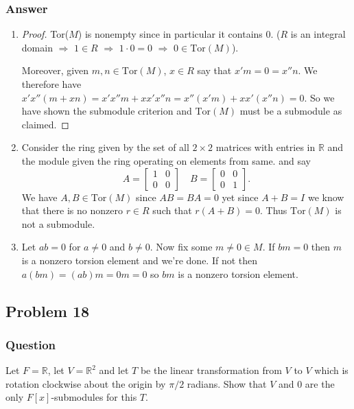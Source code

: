\documentclass[12pt]{article}
\begin{document}
\subsubsection{Answer}
\begin{enumerate}
\item \begin{proof} Tor($M$) is nonempty since in particular it contains $0$. ($R$ is an integral domain $\Rightarrow$ $1 \in R$ $\Rightarrow$ $ 1 \cdot 0 = 0$ $\Rightarrow$ $0 \in \mathrm{Tor}(M) $).

 Moreover, given $m, n \in  \mathrm{Tor}(M) $, $x \in R $ say that $x' m =0= x'' n$.  We therefore have $x'x''(m + x n)=x'x''m+x x'x'' n= x''(x'm)+ x x' (x'' n) =0$. So we have shown the submodule criterion and  $\mathrm{Tor}(M) $ must be a submodule as claimed.
\end{proof}
\item Consider the ring given by the set of all $2 \times 2$ matrices with entries in $\mathbb{R}$ and the module given the ring operating on elements from same. and say
\[A = \left[\begin{array}{lr} 1 & 0 \\0&0 \end{array} \right]  \quad B = \left[\begin{array}{lr} 0 & 0 \\0&1 \end{array} \right] .  \]
We have $A, B \in \mathrm{Tor}(M) $ since $AB=BA=0$ yet since $A+B=I$ we know that there is no nonzero $r \in R $ such that $r(A+B)=0$. Thus $\mathrm{Tor}(M) $ is not a submodule.
\item Let $a b = 0$ for $a\neq0$  and $b \neq 0$. Now fix some $m\neq 0  \in M$. If $b m = 0$ then $m$ is a nonzero torsion element and we're done. If not then $a ( b m ) =(a b) m  = 0 m = 0$ so $b m $ is a nonzero torsion element.
\end{enumerate}

\subsection{Problem 18}

\subsubsection{Question}
Let $F = \mathbb{R}$, let $V = \mathbb{R}^2$ and let $T$ be the linear transformation from $V$ to $V$ which is rotation clockwise about the origin by $\pi / 2$ radians. Show that $V$ and $0$  are the only $F[x]$-submodules for this $T$.
\end{document}
